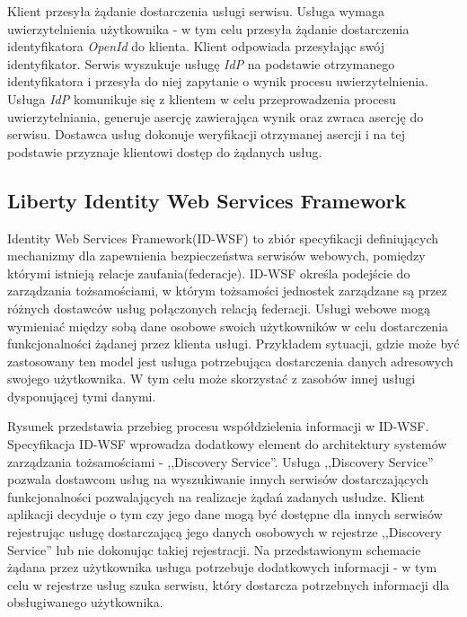 		Klient przesyła żądanie dostarczenia usługi serwisu. Usługa wymaga uwierzytelnienia użytkownika - w tym celu przesyła żądanie dostarczenia identyfikatora \textit{OpenId} do klienta. Klient odpowiada przesyłając swój identyfikator. Serwis wyszukuje usługę \textit{IdP} na podstawie otrzymanego identyfikatora i przesyła do niej zapytanie o wynik procesu uwierzytelnienia. Usługa \textit{IdP} komunikuje się z klientem w celu przeprowadzenia procesu uwierzytelniania, generuje asercję zawierająca wynik oraz zwraca asercję do serwisu. Dostawca usług dokonuje weryfikacji otrzymanej asercji i na tej podstawie przyznaje klientowi dostęp do żądanych usług.

\subsection{Liberty Identity Web Services Framework}

	Identity Web Services Framework(ID-WSF) to zbiór specyfikacji definiujących mechanizmy dla zapewnienia bezpieczeństwa serwisów webowych, pomiędzy którymi istnieją relacje zaufania(federacje)\cite{Oracle10}. ID-WSF określa podejście do zarządzania tożsamościami, w którym tożsamości jednostek zarządzane są przez różnych dostawców usług połączonych relacją federacji. Usługi webowe mogą wymieniać między sobą dane osobowe swoich użytkowników w celu dostarczenia funkcjonalności żądanej przez klienta usługi. Przykładem sytuacji, gdzie może być zastosowany ten model jest usługa potrzebująca dostarczenia danych adresowych swojego użytkownika. W tym celu może skorzystać z zasobów innej usługi 
	dysponującej tymi danymi.

	Rysunek przedstawia przebieg procesu współdzielenia informacji w ID-WSF. Specyfikacja ID-WSF wprowadza dodatkowy element do architektury systemów zarządzania tożsamościami - ,,Discovery Service''. Usługa ,,Discovery Service'' pozwala dostawcom usług na wyszukiwanie innych serwisów dostarczających funkcjonalności pozwalających na realizacje żądań zadanych usłudze. Klient aplikacji decyduje o tym czy jego dane mogą być dostępne dla innych serwisów rejestrując usługę dostarczającą jego danych osobowych w rejestrze ,,Discovery Service'' lub nie dokonując takiej rejestracji. Na przedstawionym schemacie żądana przez użytkownika usługa potrzebuje dodatkowych informacji - w tym celu w rejestrze usług szuka serwisu, który dostarcza potrzebnych informacji dla obsługiwanego użytkownika.

